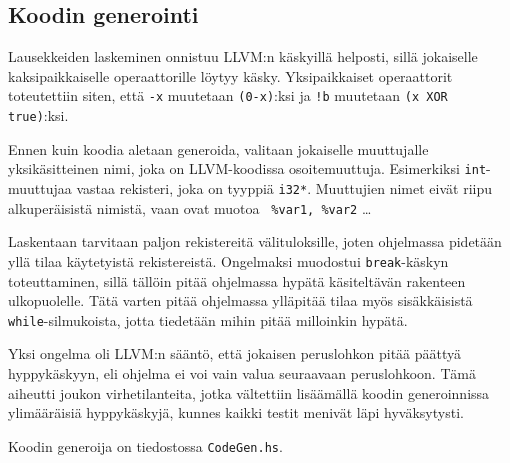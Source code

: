 \documentclass[12pt]{article}
\newcommand{\code}{\texttt}
\begin{document}
\subsection{Koodin generointi}
Lausekkeiden laskeminen onnistuu LLVM:n käskyillä helposti, sillä jokaiselle 
kaksipaikkaiselle operaattorille löytyy käsky. Yksipaikkaiset operaattorit 
toteutettiin siten, että \code{-x} muutetaan \code{(0-x)}:ksi ja 
\code{!b} muutetaan \code{(x XOR true)}:ksi.

Ennen kuin koodia aletaan generoida, valitaan jokaiselle muuttujalle yksi\-käsitteinen 
nimi, joka on LLVM-koodissa osoitemuuttuja. Esimerkiksi \code{int}-muuttujaa vastaa 
rekisteri, joka on tyyppiä \code{i32*}. Muuttujien nimet eivät riipu alkuperäisistä 
nimistä, vaan ovat muotoa \code{ \%var1, \%var2} \ldots

Laskentaan tarvitaan paljon rekistereitä välituloksille, joten ohjelmassa pidetään 
yllä tilaa käytetyistä rekistereistä. Ongelmaksi muodostui \code{break}-käskyn toteuttaminen, 
sillä tällöin pitää ohjelmassa hypätä käsiteltävän rakenteen ulko\-puolelle. Tätä varten 
pitää ohjelmassa ylläpitää tilaa myös sisäkkäisistä \code{while}-silmukoista, jotta tiedetään mihin 
pitää milloinkin hypätä. 

Yksi ongelma oli LLVM:n sääntö, että jokaisen peruslohkon pitää päättyä hyppykäskyyn, eli 
ohjelma ei voi vain valua seuraavaan peruslohkoon. Tämä aiheutti joukon virhetilanteita, 
jotka vältettiin lisäämällä koodin generoinnissa ylimääräisiä hyppykäskyjä, kunnes kaikki 
testit menivät läpi hyväksytysti.

Koodin generoija on tiedostossa \code{CodeGen.hs}.
\end{document}
